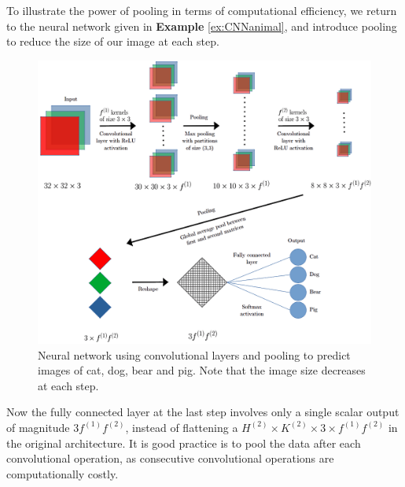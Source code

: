 \begin{example}
To illustrate the power of pooling in terms of computational efficiency, we return to the neural network given in \textbf{Example} \ref{ex:CNNanimal}, and introduce pooling to reduce the size of our image at each step.
  \begin{figure}[H]
    \centering
    \includegraphics[scale=0.35]{images/Chapter 11/poolingNetwork.png}
    \caption{Neural network using convolutional layers and pooling to predict images of cat, dog, bear and pig. Note that the image size decreases at each step.}
    \label{pooling-fig}
\end{figure}
\noindent Now the fully connected layer at the last step involves only a single scalar output of magnitude $3f^{(1)}f^{(2)}$, instead of flattening a $H^{(2)} \times K^{(2)} \times 3 \times f^{(1)}f^{(2)}$ in the original architecture. It is good practice is to pool the data after each convolutional operation, as consecutive convolutional operations are computationally costly.
\end{example}

